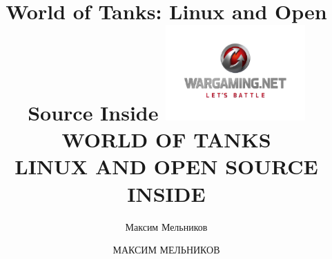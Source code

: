 \documentclass[aspectratio=169]{beamer}
\begin{document}
\title{World of Tanks: Linux and Open Source Inside}
\author{Максим Мельников}
\date{}

{
\title{
    \includegraphics[width=0.4\textwidth]{wg-logo.png}
    \\
    {\huge WORLD OF TANKS\\LINUX AND OPEN SOURCE INSIDE}
}
\author{МАКСИМ МЕЛЬНИКОВ}

\begin{frame}[plain]{}
    \titlepage
\end{frame}
}

\end{document}
